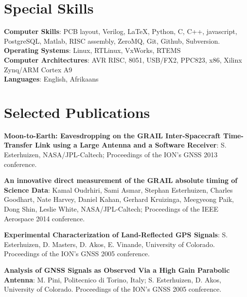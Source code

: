 \begin{resume}
\section{\sc Special Skills}
{\bf Computer Skills}: PCB layout, Verilog, \LaTeX, Python, C, C++, javascript, PostgreSQL, Matlab,
	RISC assembly, ZeroMQ, Git, Github, Subversion.\\ 
{\bf Operating Systems}: Linux, RTLinux, VxWorks, RTEMS\\
{\bf Computer Architectures}: AVR RISC, 8051, USB/FX2, PPC823, x86, Xilinx Zynq/ARM Cortex A9\\
{\bf Languages}: English, Afrikaans


\section{\sc Selected Publications}
{\bf Moon-to-Earth: Eavesdropping on the GRAIL Inter-Spacecraft Time-Transfer Link using a Large Antenna and a Software Receiver}: S. Esterhuizen, NASA/JPL-Caltech; Proceedings of the ION's GNSS 2013 conference.

{\bf An innovative direct measurement of the GRAIL absolute timing of Science Data}: Kamal Oudrhiri, Sami Asmar, Stephan Esterhuizen, Charles Goodhart, Nate Harvey, Daniel Kahan, Gerhard Kruizinga, Meegyeong Paik, Dong Shin, Leslie White, NASA/JPL-Caltech; Proceedings of the IEEE Aerospace 2014 conference.

{\bf Experimental Characterization of Land-Reflected GPS Signals}: S. Esterhuizen, D. Masters, D. Akos, E. Vinande, University of Colorado. Proceedings of the ION's GNSS 2005 conference.

{\bf Analysis of GNSS Signals as Observed Via a High Gain Parabolic Antenna}: M. Pini, Politecnico di Torino, Italy; S. Esterhuizen, D. Akos, University of Colorado. Proceedings of the ION's GNSS 2005 conference.


\end{resume}
